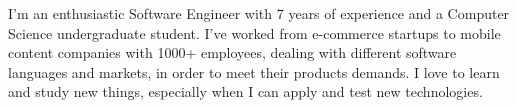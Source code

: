 %
%
%

\par{
	I'm an enthusiastic Software Engineer with 7 years of experience
	and a Computer Science undergraduate student.
	I've worked from e-commerce startups to mobile content companies with 1000+ employees,
	dealing with different software languages and markets, in order to meet their products demands.
	I love to learn and study new things, especially when I can apply and test new technologies.\\
}
